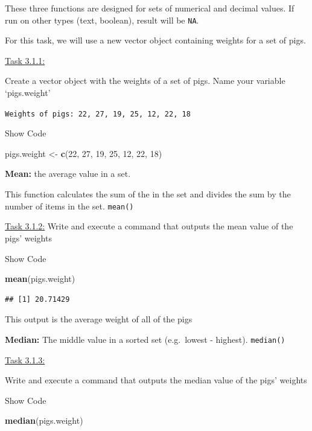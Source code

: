 \documentclass[
]{article}
\newenvironment{Shaded}{\begin{snugshade}}{\end{snugshade}}
\newcommand{\DecValTok}[1]{\textcolor[rgb]{0.00,0.00,0.81}{#1}}
\newcommand{\FunctionTok}[1]{\textcolor[rgb]{0.13,0.29,0.53}{\textbf{#1}}}
\newcommand{\NormalTok}[1]{#1}
\newcommand{\OtherTok}[1]{\textcolor[rgb]{0.56,0.35,0.01}{#1}}
\begin{document}
These three functions are designed for sets of numerical and decimal
values. If run on other types (text, boolean), result will be
\texttt{NA}.

For this task, we will use a new vector object containing weights for a
set of pigs.

\ul{Task 3.1.1:}

Create a vector object with the weights of a set of pigs. Name your
variable `pigs.weight'

\texttt{Weights\ of\ pigs:\ 22,\ 27,\ 19,\ 25,\ 12,\ 22,\ 18}

Show Code

\begin{Shaded}
\begin{Highlighting}[]
\NormalTok{pigs.weight }\OtherTok{\textless{}{-}} \FunctionTok{c}\NormalTok{(}\DecValTok{22}\NormalTok{, }\DecValTok{27}\NormalTok{, }\DecValTok{19}\NormalTok{, }\DecValTok{25}\NormalTok{, }\DecValTok{12}\NormalTok{, }\DecValTok{22}\NormalTok{, }\DecValTok{18}\NormalTok{)}
\end{Highlighting}
\end{Shaded}

\textbf{Mean:} the average value in a set.

This function calculates the sum of the in the set and divides the sum
by the number of items in the set. \texttt{mean()}

\ul{Task 3.1.2:} Write and execute a command that outputs the mean value
of the pigs' weights

Show Code

\begin{Shaded}
\begin{Highlighting}[]
\FunctionTok{mean}\NormalTok{(pigs.weight)}
\end{Highlighting}
\end{Shaded}

\begin{verbatim}
## [1] 20.71429
\end{verbatim}

This output is the average weight of all of the pigs

\textbf{Median:} The middle value in a sorted set (e.g.~lowest -
highest). \texttt{median()}

\ul{Task 3.1.3:}

Write and execute a command that outputs the median value of the pigs'
weights

Show Code

\begin{Shaded}
\begin{Highlighting}[]
\FunctionTok{median}\NormalTok{(pigs.weight)}
\end{Highlighting}
\end{Shaded}
\end{document}
